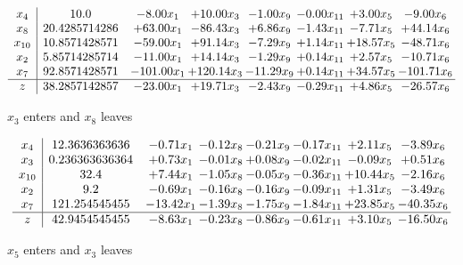 \documentclass[8pt]{article}
\begin{document}
 \[\begin{array}{c| c c@{\hskip 2pt} c@{\hskip 2pt} c@{\hskip 2pt} c@{\hskip 2pt} c@{\hskip 2pt} c@{\hskip 2pt} }
 x_{4}   &  10.0 & -8.00 x_{1} & + 10.00 x_{3} & -1.00 x_{9} & -0.00 x_{11} & +  3.00 x_{5} & -9.00 x_{6}\\
 x_{8}   &  20.4285714286 & + 63.00 x_{1} & -86.43 x_{3} & +  6.86 x_{9} & -1.43 x_{11} & -7.71 x_{5} & + 44.14 x_{6}\\
 x_{10}   &  10.8571428571 & -59.00 x_{1} & + 91.14 x_{3} & -7.29 x_{9} & +  1.14 x_{11} & + 18.57 x_{5} & -48.71 x_{6}\\
 x_{2}   &  5.85714285714 & -11.00 x_{1} & + 14.14 x_{3} & -1.29 x_{9} & +  0.14 x_{11} & +  2.57 x_{5} & -10.71 x_{6}\\
 x_{7}   &  92.8571428571 & -101.00 x_{1} & + 120.14 x_{3} & -11.29 x_{9} & +  0.14 x_{11} & + 34.57 x_{5} & -101.71 x_{6}\\
\hline
z    &  38.2857142857 & -23.00 x_{1} & + 19.71 x_{3} & -2.43 x_{9} & -0.29 x_{11} & +  4.86 x_{5} & -26.57 x_{6}\\
\end{array}\]


 $ x_{3} $ enters and $ x_{8} $ leaves 

 \[\begin{array}{c| c c@{\hskip 2pt} c@{\hskip 2pt} c@{\hskip 2pt} c@{\hskip 2pt} c@{\hskip 2pt} c@{\hskip 2pt} }
 x_{4}   &  12.3636363636 & -0.71 x_{1} & -0.12 x_{8} & -0.21 x_{9} & -0.17 x_{11} & +  2.11 x_{5} & -3.89 x_{6}\\
 x_{3}   &  0.236363636364 & +  0.73 x_{1} & -0.01 x_{8} & +  0.08 x_{9} & -0.02 x_{11} & -0.09 x_{5} & +  0.51 x_{6}\\
 x_{10}   &  32.4 & +  7.44 x_{1} & -1.05 x_{8} & -0.05 x_{9} & -0.36 x_{11} & + 10.44 x_{5} & -2.16 x_{6}\\
 x_{2}   &  9.2 & -0.69 x_{1} & -0.16 x_{8} & -0.16 x_{9} & -0.09 x_{11} & +  1.31 x_{5} & -3.49 x_{6}\\
 x_{7}   &  121.254545455 & -13.42 x_{1} & -1.39 x_{8} & -1.75 x_{9} & -1.84 x_{11} & + 23.85 x_{5} & -40.35 x_{6}\\
\hline
z    &  42.9454545455 & -8.63 x_{1} & -0.23 x_{8} & -0.86 x_{9} & -0.61 x_{11} & +  3.10 x_{5} & -16.50 x_{6}\\
\end{array}\]


 $ x_{5} $ enters and $ x_{3} $ leaves 
\end{document}
